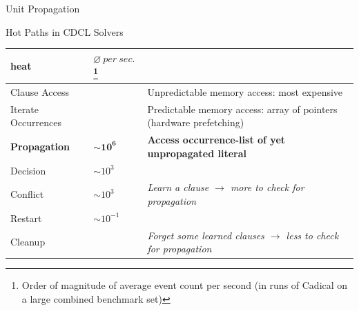 \documentclass[t]{sdqbeamer}
\begin{document}

\begin{frame}{Unit Propagation}
\begin{block}{Hot Paths in CDCL Solvers}
\renewcommand{\arraystretch}{1.5}
\begin{tabularx}{\linewidth}{l|l|X}
    \bf heat & $\varnothing~per~sec.$\footnote{Order of magnitude of average event count per second (in runs of Cadical on a large combined benchmark set)} & \\
    \hline
    \cellcolor{heat0} Clause Access & & Unpredictable memory access: most expensive\\
    \cellcolor{heat1} Iterate Occurrences & & Predictable memory access: array of pointers (hardware prefetching)\\ 
    \cellcolor{heat2} \bf Propagation & $\mathbf{\sim 10^6}$ & \bf Access occurrence-list of yet unpropagated literal\\
    \hline
    \cellcolor{heat4} Decision & $\sim 10^3$ & \\
    \cellcolor{heat5} Conflict & $\sim 10^3$ & \it Learn a clause $\rightarrow$ more to check for propagation\\
    \cellcolor{heat6} Restart & $\sim 10^{-1}$ & \\
    \cellcolor{heat7} Cleanup & & \it Forget some learned clauses $\rightarrow$ less to check for propagation
\end{tabularx}
\end{block}
\end{frame}
\end{document}
